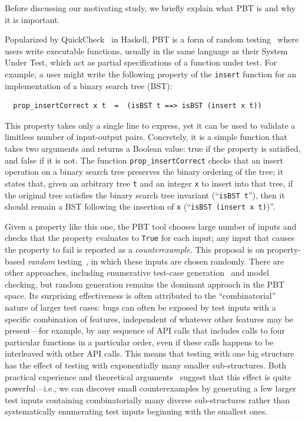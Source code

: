 Before discussing our motivating study, we briefly explain what PBT is
and why it is important.

Popularized by QuickCheck~\cite{hughes2007quickcheck} in Haskell,
PBT is a form of random testing~\cite{hamlet1994random} where
users write executable functions, usually in the same language as
their System Under Test, which act as partial
specifications of a function under test. For example, a user might
write the following property of the \lstinline{insert}
function for an implementation of a binary search tree (BST):
\begin{lstlisting}
  prop_insertCorrect x t  =  (isBST t ==> isBST (insert x t))
\end{lstlisting}
This property takes only a single
line to express, yet it can be used to validate a limitless number of
input-output pairs. Concretely, it is
a simple function that takes two arguments and returns a
Boolean value: true if the property is satisfied, and false if it is
not. The function \texttt{prop\_insertCorrect} checks
that an insert operation on a binary search tree preserves the
binary ordering of the tree; it states
that, given an arbitrary tree \texttt{t} and an integer
\texttt{x} to insert into that tree, if the original tree
satisfies the
binary search tree invariant (``\texttt{isBST t}''), then it should remain
a BST following the insertion of \texttt{x} (``\texttt{isBST (insert x t)})''.

Given a property like this one, the PBT tool chooses large number of inputs and
checks that the property evaluates to \lstinline{True} for each input; any input
that causes the property to fail is reported as a {\em counterexample}.  This
proposal is on property-based {\em random} testing~\cite{hamlet1994random}, in
which these inputs are chosen randomly.
There are other approaches, including enumerative test-case
generation~\cite[etc.]{DBLP:conf/haskell/RuncimanNL08, leancheck} and model
checking, but random generation remains the dominant approach in the PBT
space. Its surprising effectiveness is often attributed to the
``combinatorial'' nature of larger test cases: bugs can often be
exposed by test inputs with a specific combination of features,
independent of whatever other features may be present---for example,
by any sequence of API calls that includes calls to four particular
functions in a particular order, even if these calls happens to be
interleaved with other API calls.  This means that testing with one
big structure has the effect of testing with exponentially many
smaller sub-structures. Both practical experience and theoretical
arguments~\cite{goldstein2021dojudgeatest} suggest that this effect is quite
powerful---i.e., we can discover small counterexamples by generating
a few larger test inputs containing combinatorially many diverse
sub-structures rather than systematically enumerating test inputs
beginning with the smallest ones.


